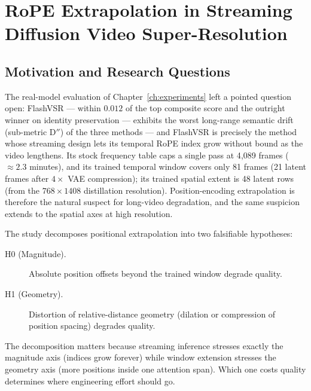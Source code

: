 \chapter{RoPE Extrapolation in Streaming Diffusion Video Super-Resolution}
\label{ch:rope}


\section{Motivation and Research Questions}
\label{sec:rope:motivation}

The real-model evaluation of Chapter~\ref{ch:experiments} left a pointed question open:
FlashVSR --- within $0.012$ of the top composite score and the outright winner on
identity preservation --- exhibits the worst long-range semantic drift (sub-metric
D$''$) of the three methods --- and FlashVSR is precisely the method whose streaming
design lets its temporal RoPE index grow without bound as the video lengthens. Its
stock frequency table caps a single pass at 4{,}089 frames ($\approx 2.3$ minutes),
and its trained temporal window covers only 81 frames (21 latent frames after
$4\times$ VAE compression); its trained spatial extent is 48 latent rows (from the
$768\times1408$ distillation resolution). Position-encoding extrapolation is
therefore the natural suspect for long-video degradation, and the same suspicion
extends to the spatial axes at high resolution.

The study decomposes positional extrapolation into two falsifiable hypotheses:

\begin{description}
    \item[H0 (Magnitude).] Absolute position offsets beyond the trained window
        degrade quality.
    \item[H1 (Geometry).] Distortion of relative-distance geometry (dilation or
        compression of position spacing) degrades quality.
\end{description}

The decomposition matters because streaming inference stresses exactly the
magnitude axis (indices grow forever) while window extension stresses the geometry
axis (more positions inside one attention span). Which one costs quality determines
where engineering effort should go.

